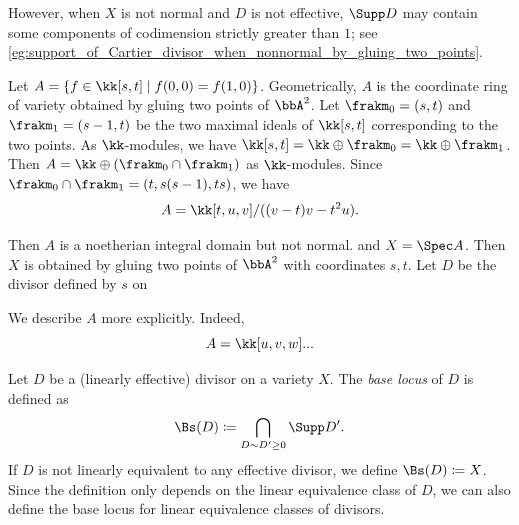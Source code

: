   \begin{remark}
    However, when $X$ is not normal and $D$ is not effective, $\Supp D$ may contain some components of codimension strictly greater than $1$; see \cref{eg:support_of_Cartier_divisor_when_nonnormal_by_gluing_two_points}.
  \end{remark}

  \begin{example}\label{eg:support_of_Cartier_divisor_when_nonnormal_by_gluing_two_points}
    Let $A = \{f \in \kk[s,t] \mid f(0,0) = f(1,0)\}$.
    Geometrically, $A$ is the coordinate ring of variety obtained by gluing two points of $\bbA^2$.
    Let $\frakm_0 = (s,t)$ and $\frakm_1 = (s-1,t)$ be the two maximal ideals of $\kk[s,t]$ corresponding to the two points.
    As $\kk$-modules, we have $\kk[s,t] = \kk \oplus \frakm_0 = \kk \oplus \frakm_1$.
    Then $A = \kk \oplus (\frakm_0 \cap \frakm_1)$ as $\kk$-modules.
    Since $\frakm_0 \cap \frakm_1 = (t, s(s-1), ts)$, we have 
    \[ A = \kk[t,u,v]/((v-t)v-t^2u). \]
    
    \Yang{}
    
    Then $A$ is a noetherian integral domain but not normal.
    and $X = \Spec A$.
    Then $X$ is obtained by gluing two points of $\bbA^2$ with coordinates $s,t$.
    Let $D$ be the divisor defined by $s$ on \Yang{}

    We describe $A$ more explicitly.
    Indeed, 
    \[ A = \kk[u,v,w]...\]

    \Yang{}
  \end{example}





  \begin{definition}
    Let $D$ be a (linearly effective) divisor on a variety $X$.
    The \emph{base locus} of $D$ is defined as
    \[ \Bs(D) \coloneqq \bigcap_{D \sim D' \geq 0} \Supp D'. \]
    If $D$ is not linearly equivalent to any effective divisor, we define $\Bs(D) \coloneqq X$.
    Since the definition only depends on the linear equivalence class of $D$, we can also define the base locus for linear equivalence classes of divisors.
  \end{definition}

